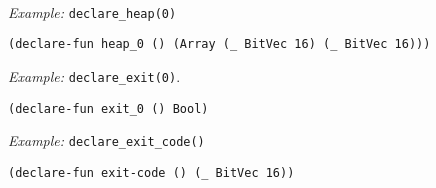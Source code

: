 ~\\
\noindent
\emph{Example:} \lstinline[style=c++]{declare_heap(0)}

\begin{lstlisting}[language=smtlib]
(declare-fun heap_0 () (Array (_ BitVec 16) (_ BitVec 16)))
\end{lstlisting}

\noindent
\emph{Example:} \lstinline[style=c++]{declare_exit(0)}.

\begin{lstlisting}[language=smtlib]
(declare-fun exit_0 () Bool)
\end{lstlisting}

\noindent
\emph{Example:} \lstinline[style=c++]{declare_exit_code()}

\begin{lstlisting}[language=smtlib]
(declare-fun exit-code () (_ BitVec 16))
\end{lstlisting}


%
%
%

%


